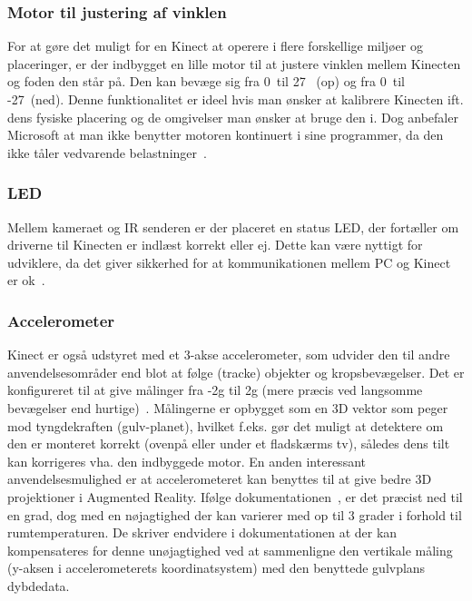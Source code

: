 \subsubsection{Motor til justering af vinklen}
For at gøre det muligt for en Kinect at operere i flere forskellige miljøer og placeringer, er der indbygget en lille motor til at justere vinklen mellem Kinecten og foden den står på.
Den kan bevæge sig fra 0\degree~til 27\degree~ (op) og fra 0\degree~til -27\degree~(ned).
Denne funktionalitet er ideel hvis man ønsker at kalibrere Kinecten ift. dens fysiske placering og de omgivelser man ønsker at bruge den i.
Dog anbefaler Microsoft at man ikke benytter motoren kontinuert i sine programmer, da den ikke tåler vedvarende belastninger~\cite{kinectDocElevationAngle}.

\subsubsection{LED}
Mellem kameraet og IR senderen er der placeret en status LED, der fortæller om driverne til Kinecten er indlæst korrekt eller ej.
Dette kan være nyttigt for udviklere, da det giver sikkerhed for at kommunikationen mellem PC og Kinect er ok~\cite[s.~15]{kinectProgrammingGuide}.

\subsubsection{Accelerometer}
Kinect er også udstyret med et 3-akse accelerometer, som udvider den til andre anvendelsesområder end blot at følge (tracke) objekter og kropsbevægelser.
Det er konfigureret til at give målinger fra -2g til 2g (mere præcis ved langsomme bevægelser end hurtige)~\cite{kinectAccelerometer}.
Målingerne  er opbygget som en 3D vektor som peger mod tyngdekraften (gulv-planet), hvilket f.eks. gør det muligt at detektere om den er monteret korrekt (ovenpå eller under et fladskærms tv), således dens tilt kan korrigeres vha. den indbyggede motor.
En anden interessant anvendelsesmulighed er at accelerometeret kan benyttes til at give bedre 3D projektioner i Augmented Reality.
Ifølge dokumentationen~\cite{kinectDocAccelerometer}, er det præcist ned til en grad, dog med en nøjagtighed der kan varierer med op til 3 grader i forhold til rumtemperaturen.
De skriver endvidere i dokumentationen at der kan kompensateres for denne unøjagtighed ved at sammenligne den vertikale måling (y-aksen i accelerometerets koordinatsystem) med den benyttede gulvplans dybdedata.


